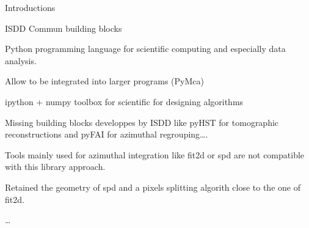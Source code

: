 
Introductions

ISDD Commun building blocks

Python programming language for scientific computing and especially data
analysis.

Allow to be integrated into larger programs (PyMca)

ipython + numpy toolbox for scientific for designing algorithms

Missing building blocks developpes by ISDD like pyHST for tomographic
reconstructions and pyFAI for azimuthal regrouping\ldots.

Tools mainly used for azimuthal integration like fit2d or spd are not
compatible with this library approach. 

Retained the geometry of spd and a pixels splitting algorith close to the one of
fit2d.

\ldots
 